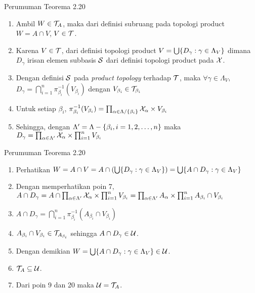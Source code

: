 \begin{frame}{Perumuman Teorema 2.20}
    \begin{tcolorbox}[enhanced,title=Teorema 2.35 (Bukti), frame style tile={width=\paperwidth}{\wallpaper}]
        \begin{enumerate}\addtocounter{enumi}{9}
            \item Ambil $W\in \nT_A$, maka dari definisi subruang pada topologi product
            $W=A\cap V$, $V\in \nT$.
            \item Karena $V\in \nT$, dari definisi topologi product
            $V=\bigcup\set*{D_\gamma : \gamma \in \Lambda_V}$ dimana $D_\gamma$ irisan 
            elemen subbasis $\nS$ dari definisi topologi product pada $\nX$.
            \item Dengan definisi $\nS$ pada \textit{product topology} terhadap $\nT$, maka $\forall\gamma\in\Lambda_V,$ 
            $D_{\gamma}=\bigcap_{i=1}^n \pi_{\beta_i}^{-1}(V_{\beta_i})$ dengan $V_{\beta_i}\in\nT_{\beta_i}$
            \item Untuk setiap $\beta_i$, $\pi_{\beta_i}^{-1}(V_{\beta_i}) = \prod_{\alpha\in\Lambda/\set{\beta_i}} \nX_\alpha \times V_{\beta_i}$
            \item Sehingga, dengan $\Lambda'=\Lambda-\set*{\beta_i,i=1,2,\dots,n}$ maka 
            $D_{\gamma}=\prod_{\alpha\in\Lambda'}\nX_\alpha\times\prod_{i=1}^n V_{\beta_i}$
        \end{enumerate}
    \end{tcolorbox}
\end{frame}

\begin{frame}{Perumuman Teorema 2.20}
    \begin{tcolorbox}[enhanced,title=Teorema 2.35 (Bukti), frame style tile={width=\paperwidth}{\wallpaper}]
        \begin{enumerate}\addtocounter{enumi}{14}
            \item Perhatikan 
            $W=A\cap V = A\cap \oio*{\bigcup\set*{D_\gamma : \gamma \in \Lambda_V}}=\bigcup\set*{A\cap D_\gamma : \gamma \in \Lambda_V}$
            \item Dengan memperhatikan poin 7,
            $A\cap D_\gamma = A\cap \prod_{\alpha\in\Lambda'}\nX_\alpha\times\prod_{i=1}^n V_{\beta_i}=\prod_{\alpha\in\Lambda'}A_\alpha\times\prod_{i=1}^n A_{\beta_i}\cap V_{\beta_i}$
            \item $A\cap D_\gamma = \bigcap_{i=1}^n \pi_{\beta_i}^{-1}(A_{\beta_i}\cap V_{\beta_i})$
            \item $A_{\beta_i}\cap V_{\beta_i} \in \nT_{A_{\beta_i}}$ sehingga $A\cap D_\gamma \in \nU$.
            \item Dengan demikian $W = \bigcup\set*{A\cap D_\gamma : \gamma \in \Lambda_V}\in \nU$.
            \item $\nT_A \subseteq \nU$.
            \item Dari poin 9 dan 20 maka $\nU = \nT_A$.
        \end{enumerate}
    \end{tcolorbox}
\end{frame}

